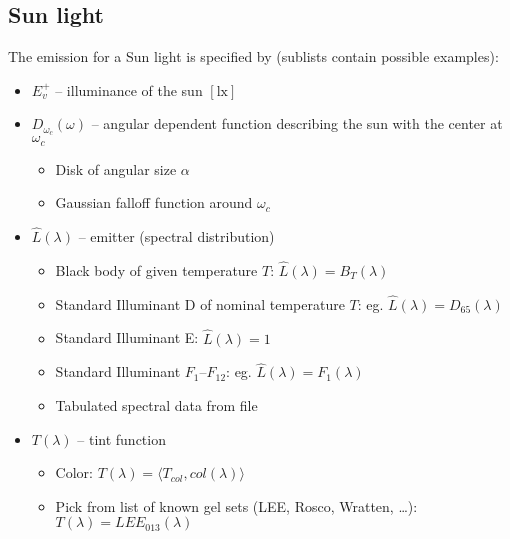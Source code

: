 
\subsection{Sun light}

The emission for a Sun light is specified by (sublists contain possible examples):

\begin{itemize}
\item $E^+_v$ -- illuminance of the sun $[\unit{\lux}]$
\item $D_{\omega_c}(\omega)$ -- angular dependent function describing the sun with the center at $\omega_c$
	\begin{itemize} \small\it
	\item Disk of angular size $\alpha$
	\item Gaussian falloff function around $\omega_c$
	\end{itemize}
\item $\hat{L}(\lambda)$ -- emitter (spectral distribution)
  \begin{itemize}\small\it
  \item Black body of given temperature $T$: $\hat L(\lambda) = B_T(\lambda)$
  \item Standard Illuminant D of nominal temperature $T$: eg. $\hat L(\lambda) = D_{65}(\lambda)$
  \item Standard Illuminant E: $\hat L(\lambda) = 1$
  \item Standard Illuminant $F_1$--$F_{12}$: eg. $\hat L(\lambda) = F_1(\lambda)$
  \item Tabulated spectral data from file
  \end{itemize}
\item $T(\lambda)$ -- tint function
  \begin{itemize}\small\it
  \item Color: $T(\lambda) = \langle T_{col}, col(\lambda) \rangle$
  \item Pick from list of known gel sets (LEE, Rosco, Wratten, \ldots): $T(\lambda) = LEE_{013} (\lambda)$
  \end{itemize}
\end{itemize}

